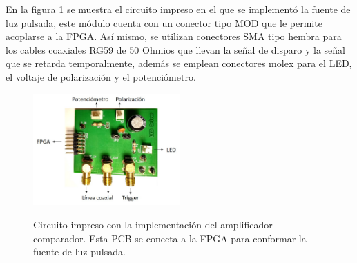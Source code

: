 En la figura \ref{fig:LED_PCB} se muestra el circuito impreso en el que se implementó la fuente de luz pulsada, este módulo cuenta con un conector tipo MOD que le permite acoplarse a la FPGA. Así mismo, se utilizan conectores  SMA tipo hembra para los cables coaxiales RG59 de 50 Ohmios que llevan la señal de disparo y la señal que se retarda temporalmente, además se emplean conectores molex para el LED, el voltaje de polarización y el potenciómetro.
\begin{figure}[h!]
\begin{centering}
    \caption{Circuito impreso con la implementación del amplificador comparador. Esta PCB se conecta a la FPGA para conformar la fuente de luz pulsada. }
    \includegraphics[width=0.5\textwidth]{Images/LED_PCB.jpg}
    \label{fig:LED_PCB}
  \par\end{centering}
\end{figure}
